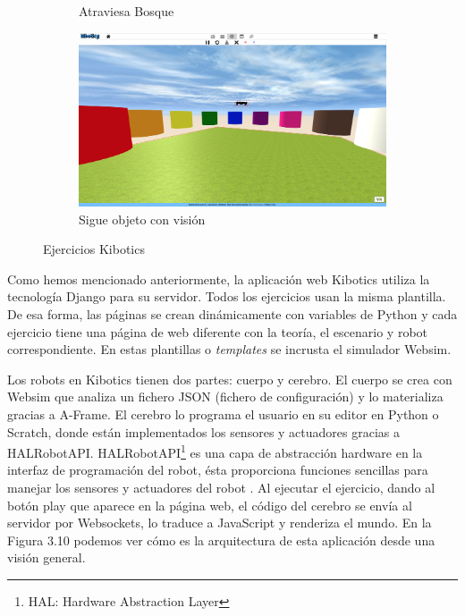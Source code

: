 \begin{figure}[H]
\begin{subfigure}{.5\textwidth}
  \caption{Atraviesa Bosque}
  \label{fig:sub-third}
\end{subfigure}
\begin{subfigure}{.5\textwidth}
  \centering
  \includegraphics[width=.95\linewidth]{chapters/images/colores.png}  
  \caption{Sigue objeto con visión}
  \label{fig:sub-fourth}
\end{subfigure}
\caption{Ejercicios Kibotics}
\label{fig:partes robot}
\end{figure}

Como hemos mencionado anteriormente, la aplicación web Kibotics utiliza la tecnología Django para su servidor. Todos los ejercicios usan la misma plantilla. De esa forma, las páginas se crean dinámicamente con variables de Python y cada ejercicio tiene una página de web diferente con la teoría, el escenario y robot correspondiente.  En estas plantillas o \textit{templates} se incrusta el simulador Websim.

Los robots en Kibotics tienen dos partes: cuerpo y cerebro. El cuerpo se crea con Websim que analiza un fichero JSON (fichero de configuración) y lo materializa gracias a A-Frame. El cerebro lo programa el usuario en su editor en Python o Scratch, donde están implementados los sensores y actuadores gracias a HALRobotAPI. HALRobotAPI\footnote{HAL: Hardware Abstraction Layer} es una capa de abstracción hardware  en la interfaz de programación del robot, ésta proporciona funciones sencillas para manejar los sensores y actuadores del robot . Al ejecutar el ejercicio, dando al botón play que aparece en la página web, el código del cerebro se envía al servidor por Websockets, lo traduce a JavaScript y renderiza el mundo. En la Figura 3.10 podemos ver cómo es la arquitectura de esta aplicación desde una visión general. 

